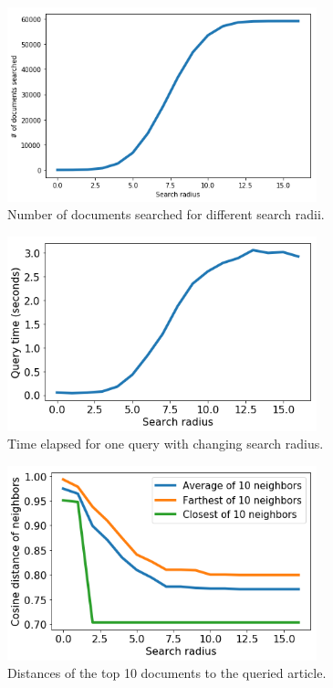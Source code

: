 \documentclass[12pt]{scrreprt}
\begin{document}
\begin{figure}[H]
  \begin{center}
    \caption{Number of documents searched for different search radii.}
    \label{fig:docs_93}
    \includegraphics[width=0.8\textwidth, angle=0]{output/output_93_0.png}
  \end{center}
\end{figure}
\begin{figure}[H]
  \begin{center}
    \caption{Time elapsed for one query with changing search radius.}
    \label{fig:time_93}
    \includegraphics[width=0.8\textwidth, angle=0]{output/output_93_1.png}
  \end{center}
\end{figure}
\begin{figure}[H]
  \begin{center}
    \caption{Distances of the top 10 documents to the queried article.}
    \label{fig:accuracy_93}
    \includegraphics[width=0.8\textwidth, angle=0]{output/output_93_2.png}
  \end{center}
\end{figure}
\end{document}

